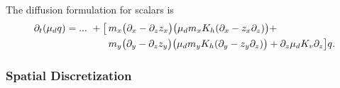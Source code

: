 The diffusion formulation for scalars is
%
\begin{align}
\partial_t (\mu_d q) = ...\,\, + \bigl[
& \, m_x \bigl(\partial_x - \partial_z z_x \bigr )
\bigl( \mu_d m_x K_h (\partial_x - z_x \partial_z ) \bigr) 
+ 
\notag \\
& \, m_y \bigl(\partial_y - \partial_z z_y \bigr )
\bigl( \mu_d m_y K_h (\partial_y - z_y \partial_z ) \bigr) 
+  \partial_z \mu_d K_v \partial_z 
\bigr]  q.
\label{scalar-disp-phys}
\end{align}

\subsubsection{Spatial Discretization}

